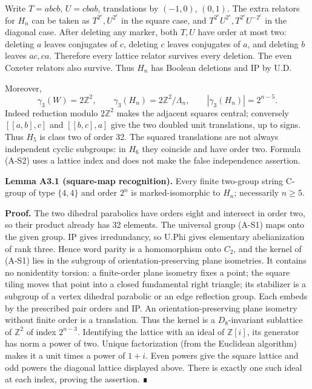 \documentclass[
  11pt,
  a4paper,
]{article}
\begin{document}
Write \(T=abcb\), \(U=cbab\), translations by \((-1,0)\), \((0,1)\). The
extra relators for \(H_n\) can be taken as \(T^{2^e},U^{2^e}\) in the
square case, and \(T^{2^e}U^{2^e},T^{2^e}U^{-2^e}\) in the diagonal
case. After deleting any marker, both \(T,U\) have order at most two:
deleting \(a\) leaves conjugates of \(c\), deleting \(c\) leaves
conjugates of \(a\), and deleting \(b\) leaves \(ac,ca\). Therefore
every lattice relator survives every deletion. The even Coxeter relators
also survive. Thus \(H_n\) has Boolean deletions and IP by U.D.

Moreover, \[
 \gamma_3(W)=2\mathbb Z^2,
 \qquad \gamma_3(H_n)=2\mathbb Z^2/\Lambda_n,
 \qquad |\gamma_3(H_n)|=2^{n-5}.                         \tag{A-S2}
\] Indeed reduction modulo \(2\mathbb Z^2\) makes the adjacent squares
central; conversely \([[a,b],c]\) and \([[b,c],a]\) give the two doubled
unit translations, up to signs. Thus \(H_5\) is class two of order 32.
The squared translations are not always independent cyclic subgroups: in
\(H_6\) they coincide and have order two. Formula (A-S2) uses a lattice
index and does not make the false independence assertion.

\textbf{Lemma A3.1 (square-map recognition).} Every finite two-group
string C-group of type \(\{4,4\}\) and order \(2^n\) is
marked-isomorphic to \(H_n\); necessarily \(n\ge5\).

\textbf{Proof.} The two dihedral parabolics have orders eight and
intersect in order two, so their product already has 32 elements. The
universal group (A-S1) maps onto the given group. IP gives irredundancy,
so U.Phi gives elementary abelianization of rank three. Hence word
parity is a homomorphism onto \(C_2\), and the kernel of (A-S1) lies in
the subgroup of orientation-preserving plane isometries. It contains no
nonidentity torsion: a finite-order plane isometry fixes a point; the
square tiling moves that point into a closed fundamental right triangle;
its stabilizer is a subgroup of a vertex dihedral parabolic or an edge
reflection group. Each embeds by the prescribed pair orders and IP. An
orientation-preserving plane isometry without finite order is a
translation. Thus the kernel is a \(D_8\)-invariant sublattice of
\(\mathbb Z^2\) of index \(2^{n-3}\). Identifying the lattice with an
ideal of \(\mathbb Z[i]\), its generator has norm a power of two. Unique
factorization (from the Euclidean algorithm) makes it a unit times a
power of \(1+i\). Even powers give the square lattice and odd powers the
diagonal lattice displayed above. There is exactly one such ideal at
each index, proving the assertion. ∎
\end{document}
